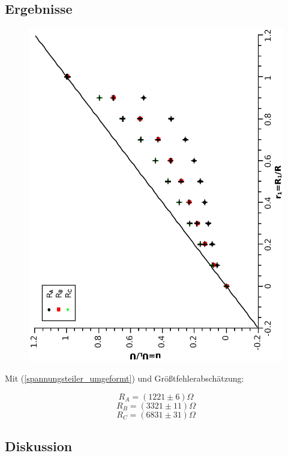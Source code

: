 \documentclass{article}
\begin{document}
\subsection{Ergebnisse}
\begin{center}
\begin{figure}
\includegraphics[scale=0.5,angle=-90]{spannungsteiler.eps}
\end{figure}
\end{center}
Mit  (\ref{spannungsteiler_umgeformt}) und Größtfehlerabschätzung:

$$R_A=(1221\pm6) \Omega$$
$$R_B=(3321 \pm 11) \Omega $$
$$R_C=(6831 \pm 31) \Omega $$

\subsection{Diskussion}
\end{document}
